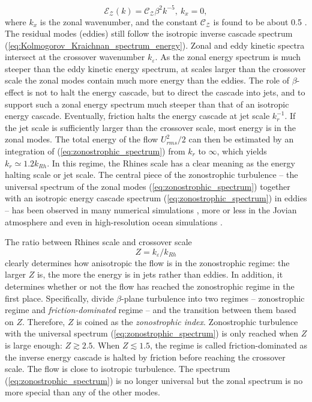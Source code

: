 \documentclass{ametsoc}
\begin{document}
\begin{equation}
\mathcal{E_{Z}}(k)=\mathcal{C_{Z}}\beta^{2}k^{-5},\ k_{x}=0,\label{eq:zonostrophic_spectrum}
\end{equation}
where $k_{x}$ is the zonal wavenumber, and the constant $\mathcal{C_{Z}}$
is found to be about 0.5 \citep{Sukoriansky2002,Smith2002,Galperin2010}.
The residual modes (eddies) still follow the isotropic inverse cascade
spectrum (\ref{eq:Kolmogorov_Kraichnan_spectrum_energy}). Zonal and
eddy kinetic spectra intersect at the crossover wavenumber $k_{\varepsilon}$.
As the zonal energy spectrum is much steeper than the eddy kinetic
energy spectrum, at scales larger than the crossover scale the zonal
modes contain much more energy than the eddies. The role of $\beta$-effect
is not to halt the energy cascade, but to direct the cascade into jets,
and to support such a zonal energy spectrum much steeper than that
of an isotropic energy cascade. Eventually, friction halts the energy
cascade at jet scale $k_{r}^{-1}$. If the jet scale is sufficiently larger 
than the crossover scale, most energy is in the zonal modes. The total
energy of the flow $U_{rms}^{2}/2$ can then be estimated by an integration
of (\ref{eq:zonostrophic_spectrum}) from $k_{r}$ to $\infty$, which
yields $k_{r}\simeq1.2k_{Rh}$. In this regime, the Rhines scale has a
clear meaning as the energy halting scale or jet scale. The central
piece of the zonostrophic turbulence -- the universal spectrum of
the zonal modes (\ref{eq:zonostrophic_spectrum}) together with an
isotropic energy cascade spectrum (\ref{eq:zonostrophic_spectrum})
in eddies -- has been observed in many numerical simulations \citep{Chekhlov1996,Smith2002,Huang2001,Sukoriansky2002,Sukoriansky2007},
more or less in the Jovian atmosphere \citep{Sukoriansky2002,Choi2011,Galperin2014}
and even in high-resolution ocean simulations \citep{Galperin2004}.

The ratio between Rhines scale and crossover scale 
\begin{equation}
Z=k_{\varepsilon}/k_{Rh}\label{eq:zonostrophic_index_def}
\end{equation}
clearly determines how anisotropic the flow is in the zonostrophic
regime: the larger $Z$ is, the more the energy is in jets rather than
eddies. In addition, it determines whether or not the flow has reached
the zonostrophic regime in the first place. Specifically, \citet{Galperin2010}
divide $\beta$-plane turbulence into two regimes -- zonostrophic
regime and \textit{friction-dominated} regime -- and the transition
between them based on $Z$. Therefore, $Z$ is coined as the \textit{zonostrophic
index}. Zonostrophic turbulence with the universal spectrum (\ref{eq:zonostrophic_spectrum})
is only reached when $Z$ is large enough: $Z\gtrsim2.5$. When $Z\lesssim1.5$,
the regime is called friction-dominated as the inverse energy cascade
is halted by friction before reaching the crossover scale. The flow
is close to isotropic turbulence. The spectrum (\ref{eq:zonostrophic_spectrum})
is no longer universal but the zonal spectrum is no more special than any of the other modes.
\end{document}
